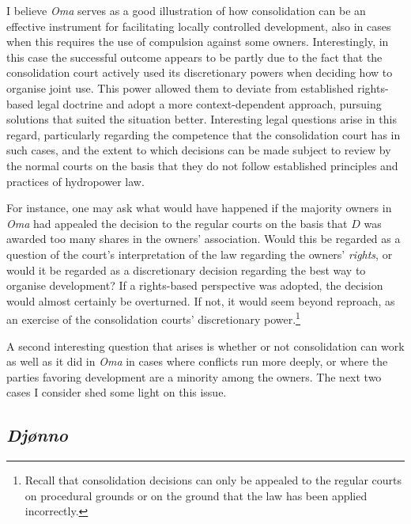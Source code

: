 I believe \emph{Oma} serves as a good illustration of how consolidation can be an effective instrument for facilitating locally controlled development, also in cases when this requires the use of compulsion against some owners. Interestingly, in this case the successful outcome appears to be partly due to the fact that the consolidation court actively used its discretionary powers when deciding how to organise joint use. This power allowed them to deviate from established rights-based legal doctrine and adopt a more context-dependent approach, pursuing solutions that suited the situation better. Interesting legal questions arise in this regard, particularly regarding the competence that the consolidation court has in such cases, and the extent to which decisions can be made subject to review by the normal courts on the basis that they do not follow established principles and practices of hydropower law.

For instance, one may ask what would have happened if the majority owners in \emph{Oma} had appealed the decision to the regular courts on the basis that $D$ was awarded too many shares in the owners' association. Would this be regarded as a question of the court's interpretation of the law regarding the owners' \emph{rights}, or would it be regarded as a discretionary decision regarding the best way to organise development? If a rights-based perspective was adopted, the decision would almost certainly be overturned. If not, it would seem beyond reproach, as an exercise of the consolidation courts' discretionary power.\footnote{Recall that consolidation decisions can only be appealed to the regular courts on procedural grounds or on the ground that the law has been applied incorrectly.}

A second interesting question that arises is whether or not consolidation can work as well as it did in \emph{Oma} in cases where conflicts run more deeply, or where the parties favoring development are a minority among the owners. The next two cases I consider shed some light on this issue.

\subsection{\emph{Djønno}}

